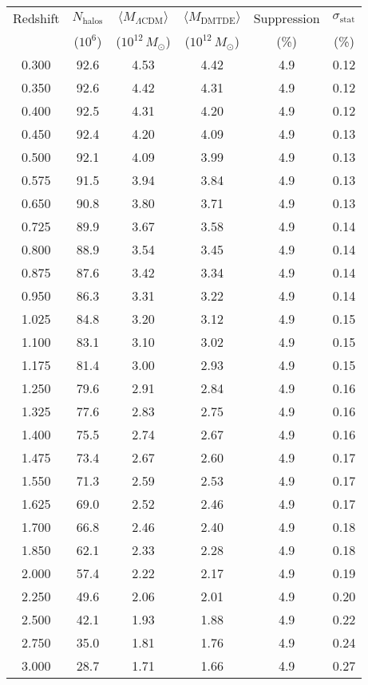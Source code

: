 \documentclass[aps,prd,twocolumn,superscriptaddress,nofootinbib,floatfix,preprintnumbers]{revtex4-2}
\newcommand{\LCDM}{\ensuremath{\Lambda\text{CDM}}\xspace}
\newcommand{\Msun}{\ensuremath{M_\odot}\xspace}
\begin{document}
\begin{table*}[t]
\caption{Mean halo mass suppression in DMTDE across 27 AbacusSummit snapshots. Weighted mean: $4.90 \pm 0.15\%$ (statistical uncertainty from jackknife resampling). Total halos analyzed: $2.3 \times 10^9$.\footnote{Extended high-redshift data ($z = 5.0$--$8.0$) showing consistent suppression available in Supplementary Table S1.}}
\label{tab:allz}
\centering
\begin{tabular}{cccccc}
\toprule
Redshift & $N_{\mathrm{halos}}$ & $\langle M_{\LCDM} \rangle$ & $\langle M_{\mathrm{DMTDE}} \rangle$ & Suppression & $\sigma_{\mathrm{stat}}$ \\
         & ($10^6$) & ($10^{12}\,\Msun$) & ($10^{12}\,\Msun$) & (\%) & (\%) \\
\midrule
0.300 & 92.6 & 4.53 & 4.42 & 4.9 & 0.12 \\
0.350 & 92.6 & 4.42 & 4.31 & 4.9 & 0.12 \\
0.400 & 92.5 & 4.31 & 4.20 & 4.9 & 0.12 \\
0.450 & 92.4 & 4.20 & 4.09 & 4.9 & 0.13 \\
0.500 & 92.1 & 4.09 & 3.99 & 4.9 & 0.13 \\
0.575 & 91.5 & 3.94 & 3.84 & 4.9 & 0.13 \\
0.650 & 90.8 & 3.80 & 3.71 & 4.9 & 0.13 \\
0.725 & 89.9 & 3.67 & 3.58 & 4.9 & 0.14 \\
0.800 & 88.9 & 3.54 & 3.45 & 4.9 & 0.14 \\
0.875 & 87.6 & 3.42 & 3.34 & 4.9 & 0.14 \\
0.950 & 86.3 & 3.31 & 3.22 & 4.9 & 0.14 \\
1.025 & 84.8 & 3.20 & 3.12 & 4.9 & 0.15 \\
1.100 & 83.1 & 3.10 & 3.02 & 4.9 & 0.15 \\
1.175 & 81.4 & 3.00 & 2.93 & 4.9 & 0.15 \\
1.250 & 79.6 & 2.91 & 2.84 & 4.9 & 0.16 \\
1.325 & 77.6 & 2.83 & 2.75 & 4.9 & 0.16 \\
1.400 & 75.5 & 2.74 & 2.67 & 4.9 & 0.16 \\
1.475 & 73.4 & 2.67 & 2.60 & 4.9 & 0.17 \\
1.550 & 71.3 & 2.59 & 2.53 & 4.9 & 0.17 \\
1.625 & 69.0 & 2.52 & 2.46 & 4.9 & 0.17 \\
1.700 & 66.8 & 2.46 & 2.40 & 4.9 & 0.18 \\
1.850 & 62.1 & 2.33 & 2.28 & 4.9 & 0.18 \\
2.000 & 57.4 & 2.22 & 2.17 & 4.9 & 0.19 \\
2.250 & 49.6 & 2.06 & 2.01 & 4.9 & 0.20 \\
2.500 & 42.1 & 1.93 & 1.88 & 4.9 & 0.22 \\
2.750 & 35.0 & 1.81 & 1.76 & 4.9 & 0.24 \\
3.000 & 28.7 & 1.71 & 1.66 & 4.9 & 0.27 \\
\bottomrule
\end{tabular}
\end{table*}
\end{document}
